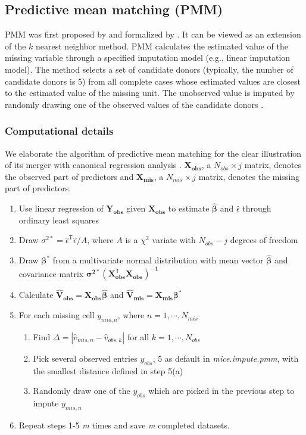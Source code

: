 	\subsection{Predictive mean matching (PMM)}
	PMM was first proposed by \citet{rubin1986statistical}and formalized by \citet{little1988missing}. It can be viewed as an extension of the $k$ nearest neighbor method. PMM calculates the estimated value of the missing variable through a specified imputation model (e.g., linear imputation model). The method selects a set of candidate donors (typically, the number of candidate donors is 5) from all complete cases whose estimated values are closest to the estimated value of the missing unit. The unobserved value is imputed by randomly drawing one of the observed values of the candidate donors \citep{Buuren2018}.
	
	\subsubsection{Computational details}
	We elaborate the algorithm of predictive mean matching for the clear illustration of its merger with canonical regression analysis \citep{Vink2015}. $\boldsymbol{X_{obs}}$, a $N_{obs} \times j$ matrix, denotes the observed part of predictors and $\boldsymbol{X_{mis}}$, a $N_{mis} \times j$ matrix, denotes the missing part of predictors. 
	\begin{enumerate}
		\item Use linear regression of $\boldsymbol{Y_{obs}}$ given $\boldsymbol{X_{obs}}$ to estimate $\boldsymbol{\hat{\beta}}$ and $\hat{\epsilon}$ through ordinary least squares
		\item Draw $\sigma^{2\ast}=\hat{\epsilon}^\mathsf{T}\hat{\epsilon}/A$, where $A$ is a $\chi^2$ variate with $N_{obs}-j$ degrees of freedom
		\item Draw $\boldsymbol{\beta^{\ast}}$ from a multivariate normal distribution with mean vector $\boldsymbol{\hat{\beta}}$ and covariance matrix $\boldsymbol{\sigma^{2\ast}(X^\mathsf{T}_{obs}X_{obs})^{-1}}$
		\item Calculate $\boldsymbol{\hat{V}_{obs}=X_{obs}\hat{\beta}}$ and $\boldsymbol{\hat{V}_{mis}=X_{mis}\beta^{\ast}}$
		\item For each missing cell $y_{mis,n}$, where $n=1,\cdots,N_{mis}$
		\begin{enumerate}
			\item Find $\Delta=|\hat{v}_{mis,n}-\hat{v}_{obs,k}|$ for all $k=1,\cdots,N_{obs}$
			\item Pick several observed entries $y_{obs}$, 5 as default in \emph{mice.impute.pmm}, with the smallest distance defined in step 5(a)
			\item Randomly draw one of the $y_{obs}$ which are picked in the previous step to impute $y_{mis,n}$  
		\end{enumerate}
		\item Repeat steps 1-5 \emph{m} times and save \emph{m} completed datasets. 
	\end{enumerate}
	
